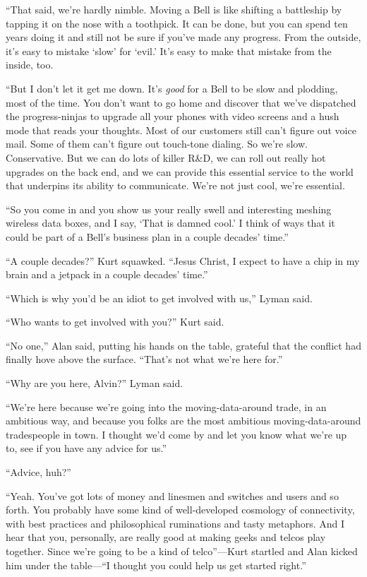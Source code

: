\documentclass{article}
\begin{document}
``That said, we're hardly nimble.  Moving a Bell is like shifting a
battleship by tapping it on the nose with a toothpick.  It can be
done, but you can spend ten years doing it and still not be sure if
you've made any progress.  From the outside, it's easy to mistake
`slow' for `evil.' It's easy to make that mistake from the inside,
too.

``But I don't let it get me down.  It's \textit{good} for a Bell to be
slow and plodding, most of the time.  You don't want to go home and
discover that we've dispatched the progress-ninjas to upgrade all your
phones with video screens and a hush mode that reads your thoughts. 
Most of our customers still can't figure out voice mail.  Some of them
can't figure out touch-tone dialing.  So we're slow.  Conservative. 
But we can do lots of killer R\&D, we can roll out really hot
upgrades on the back end, and we can provide this essential service to
the world that underpins its ability to communicate.  We're not just
cool, we're essential.

``So you come in and you show us your really swell and interesting
meshing wireless data boxes, and I say, `That is damned cool.' I think
of ways that it could be part of a Bell's business plan in a couple
decades' time.''

``A couple decades?'' Kurt squawked.  ``Jesus Christ, I expect to have
a chip in my brain and a jetpack in a couple decades' time.''

``Which is why you'd be an idiot to get involved with us,'' Lyman
said.

``Who wants to get involved with you?'' Kurt said.

``No one,'' Alan said, putting his hands on the table, grateful that
the conflict had finally hove above the surface.  ``That's not what
we're here for.''

``Why are you here, Alvin?'' Lyman said.

``We're here because we're going into the moving-data-around trade, in
an ambitious way, and because you folks are the most ambitious
moving-data-around tradespeople in town.  I thought we'd come by and
let you know what we're up to, see if you have any advice for us.''

``Advice, huh?''

``Yeah.  You've got lots of money and linesmen and switches and users
and so forth.  You probably have some kind of well-developed cosmology
of connectivity, with best practices and philosophical ruminations and
tasty metaphors.  And I hear that you, personally, are really good at
making geeks and telcos play together.  Since we're going to be a kind
of telco''---Kurt startled and Alan kicked him under the table---``I
thought you could help us get started right.''
\end{document}
